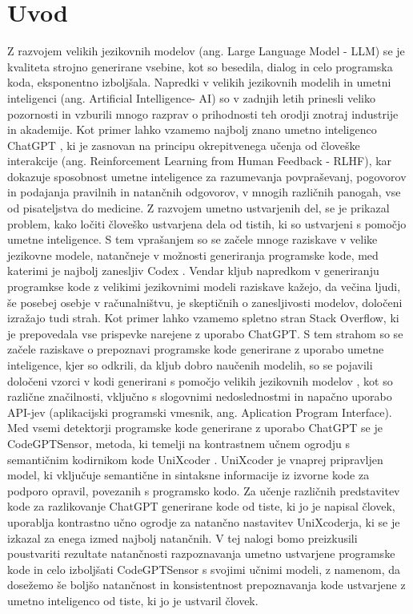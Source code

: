\documentclass[sigconf,nonacm]{acmart}
\begin{document}
\section{Uvod}
Z razvojem velikih jezikovnih modelov (ang. Large Language Model - LLM) \cite{naveed2023comprehensive} se je kvaliteta strojno generirane vsebine, kot so besedila, dialog in celo programska koda, eksponentno izboljšala. Napredki v velikih jezikovnih modelih in umetni inteligenci (ang. Artificial Intelligence- AI) so v zadnjih letih prinesli veliko pozornosti in vzburili mnogo razprav o prihodnosti teh orodji znotraj industrije in akademije. Kot primer lahko vzamemo najbolj znano umetno inteligenco ChatGPT \cite{sakib2023chatgpt}, ki je zasnovan na principu okrepitvenega učenja od človeške interakcije (ang. Reinforcement Learning from Human Feedback - RLHF)\cite{lee2023rlaif}, kar dokazuje sposobnost umetne inteligence za razumevanja povpraševanj, pogovorov in podajanja pravilnih in natančnih odgovorov, v mnogih različnih panogah, vse od pisateljstva do medicine.
Z razvojem umetno ustvarjenih del, se je prikazal problem, kako ločiti človeško ustvarjena dela od tistih, ki so ustvarjeni s pomočjo umetne inteligence. S tem vprašanjem so se začele mnoge raziskave v velike jezikovne modele, natančneje v možnosti generiranja programske kode, med katerimi je najbolj zanesljiv Codex \cite{zhao2023empirical}. Vendar kljub napredkom v generiranju programkse kode z velikimi jezikovnimi modeli raziskave kažejo, da večina ljudi, še posebej osebje v računalništvu, je skeptičnih o zanesljivosti modelov, določeni izražajo tudi strah. Kot primer lahko vzamemo spletno stran Stack Overflow, ki je prepovedala vse prispevke narejene z uporabo ChatGPT.
S tem strahom so se začele raziskave o prepoznavi programske kode generirane z uporabo umetne inteligence, kjer so odkrili, da kljub dobro naučenih modelih, so se pojavili določeni vzorci v kodi generirani s pomočjo velikih jezikovnih modelov \cite{cave2019hopes}, kot so različne značilnosti, vključno s slogovnimi nedoslednostmi in napačno uporabo API-jev (aplikacijski programski vmesnik, ang. Aplication Program Interface).
Med vsemi detektorji programske kode generirane z uporabo ChatGPT se je CodeGPTSensor\cite{xu2024distinguishing}, metoda, ki temelji na kontrastnem učnem ogrodju s semantičnim kodirnikom kode UniXcoder \cite{guo2022unixcoder}. UniXcoder je vnaprej pripravljen model, ki vključuje semantične in sintaksne informacije iz izvorne kode za podporo opravil, povezanih s programsko kodo. Za učenje različnih predstavitev kode za razlikovanje ChatGPT generirane kode od tiste, ki jo je napisal človek, uporablja kontrastno učno ogrodje za natančno nastavitev UniXcoderja, ki se je izkazal za enega izmed najbolj natančnih.
V tej nalogi bomo preizkusili poustvariti rezultate natančnosti razpoznavanja umetno ustvarjene programske kode in celo izboljšati CodeGPTSensor s svojimi učnimi modeli, z namenom, da dosežemo še boljšo natančnost in konsistentnost prepoznavanja kode ustvarjene z umetno inteligenco od tiste, ki jo je ustvaril človek.
\end{document}
